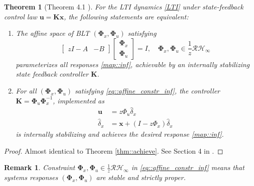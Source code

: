\documentclass{article}[12pt]
\newtheorem{theorem}{Theorem}
\newtheorem{remark}{Remark}
\begin{document}
\begin{theorem}[Theorem 4.1 \cite{anderson2019system}]
\label{thm::achieve_inf}
For the LTI dynamics \eqref{LTI} under state-feedback control law $\mathbf{u}=\mathbf{K} \mathbf{x}$, the following statements are equivalent:
\begin{enumerate}
    \item The affine space of BLT $(\mathbf{\Phi}_{x}, \mathbf{\Phi}_u)$ satisfying 
    \begin{equation}
    \label{eq::affine_constr_inf}
        \left[\begin{array}{cc}{z I-A} & {-B}\end{array}\right]\left[\begin{array}{c}{\mathbf{\Phi}_{x}} \\ {\mathbf{\Phi}_{u}}\end{array}\right]=I, \quad \mathbf{\Phi}_{x}, \mathbf{\Phi}_{u} \in \frac{1}{z}  \mathcal{RH}_{\infty}
    \end{equation}
    parameterizes all responses \eqref{map::inf}, achievable by an
    internally stabilizing state feedback controller $\mathbf{K}$.
    \item For all $(\mathbf{\Phi}_{x}, \mathbf{\Phi}_u)$ satisfying \eqref{eq::affine_constr_inf}, the controller $\mathbf{K}=\mathbf{\Phi}_{u} \mathbf{\Phi}_{x}^{-1}$, implemented as
    \begin{equation}
    \label{contrl::inf}
        \begin{aligned} \mathbf{u} &=z \Phi_{u} \hat{\delta}_{x} \\ \hat{\delta}_{x} &=\mathbf{x}+\left(I-z \Phi_{x}\right) \hat{\delta}_{x} \end{aligned}
    \end{equation}
    is internally stabilizing and achieves the desired response \eqref{map::inf}.
\end{enumerate}
\end{theorem}

\begin{proof}
Almost identical to Theorem \ref{thm::achieve}. See Section 4 in \cite{anderson2019system}.
\end{proof}

\begin{remark}
Constraint $\mathbf{\Phi}_{x}, \mathbf{\Phi}_{u} \in \frac{1}{z}  \mathcal{RH}_{\infty}$ in \eqref{eq::affine_constr_inf} means that systems responses $(\mathbf{\Phi}_{x}, \mathbf{\Phi}_u)$ are stable and strictly proper.
\end{remark}
\end{document}
